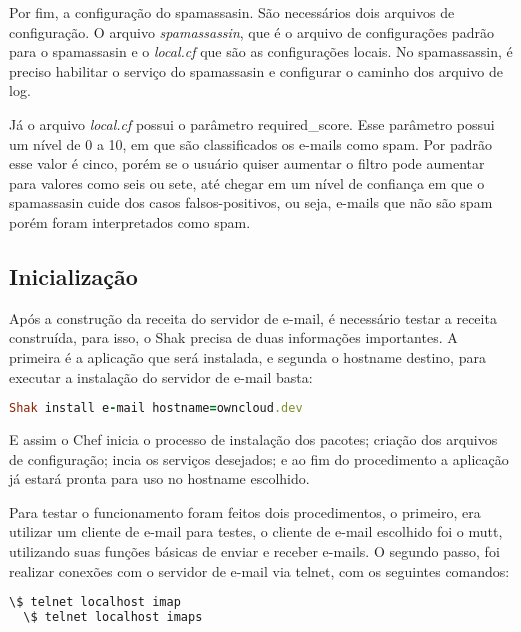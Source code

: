 Por fim, a configuração do spamassasin. São necessários dois arquivos de configuração.
O arquivo \textit{spamassassin}, que é o arquivo de configurações padrão para o spamassasin e o
\textit{local.cf} que são as configurações locais. No spamassassin, é preciso habilitar 
o serviço do spamassasin e configurar o caminho dos arquivo de log.

Já o arquivo \textit{local.cf} possui o parâmetro required\_score. Esse parâmetro 
possui um nível de 0 a 10, em que 
são classificados os e-mails como spam. Por padrão esse valor é cinco, porém se 
o usuário quiser aumentar o filtro pode aumentar para valores como seis ou sete, 
até chegar em um nível de confiança em que o spamassasin cuide dos casos falsos-positivos, 
ou seja, e-mails que não são spam porém foram interpretados como spam.

\subsection{Inicialização}

Após a construção da receita do servidor de e-mail, é necessário testar a receita construída,
para isso, o Shak precisa de duas informações importantes. A primeira é a aplicação
que será instalada, e segunda o hostname destino, para executar a instalação
do servidor de e-mail basta:

\begin{lstlisting}[language=Ruby,label=dice_index,caption={Exemplo de execução de instalação do servidor de e-mailcom shak}]
Shak install e-mail hostname=owncloud.dev
\end{lstlisting}


E assim o Chef inicia o processo de instalação dos pacotes; criação dos arquivos
de configuração; incia os serviços desejados; e ao fim do procedimento a aplicação
já estará pronta para uso no hostname escolhido.

Para testar o funcionamento foram feitos dois procedimentos, o primeiro, era utilizar
um cliente de e-mail para testes, o cliente de e-mail escolhido foi o mutt, utilizando
suas funções básicas de enviar e receber e-mails. O segundo passo, foi realizar conexões
com o servidor de e-mail via telnet, com os seguintes comandos:

\begin{lstlisting}[language=Ruby,label=dice_index,caption={Exemplo de teste de conexão telnet no servidor imap}]
  \$ telnet localhost imap
  \$ telnet localhost imaps
\end{lstlisting}

